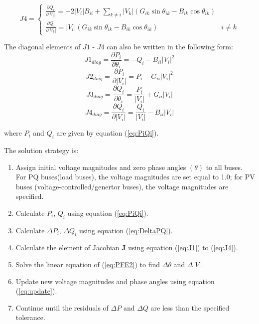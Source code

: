 \documentclass[12pt]{article}
\begin{document}
\begin{equation}\label{eq:J4}
J4 =\left\{\begin{matrix}

\frac{\partial Q_i}{\partial |V_i|} = -2|V_i|B_{ii} + \sum_{k\ne i}{|V_k|  \left (G_{ik}\sin\theta_{ik} - B_{ik}\cos\theta_{ik}\right )} &\\
\frac{\partial Q_i}{\partial |V_k|} = |V_i|\left ( G_{ik}\sin\theta_{ik} -  B_{ik}\cos\theta_{ik}\right )    & i\ne k

\end{matrix}\right .
\end{equation} 

The diagonal elements of $J1$ - $J4$ can also be written in the following form:
\begin{equation}\label{eq:J1D}
J1_{diag} = \frac{\partial P_i}{\partial \theta_i} = -Q_i - B_{ii}|V_i|^2
\end{equation} 
\begin{equation}\label{eq:J2D}
J2_{diag} = \frac{\partial P_i}{\partial |V_i|} = P_i - G_{ii}|V_i|^2
\end{equation} 
\begin{equation}\label{eq:J3D}
J3_{diag} = \frac{\partial Q_i}{\partial \theta_i} = \frac{P_i}{|V_i|} + G_{ii}|V_i|
\end{equation} 
\begin{equation}\label{eq:J4D}
J4_{diag} = \frac{\partial Q_i}{\partial |V_i|} = \frac{Q_i}{|V_i|} - B_{ii}|V_i|
\end{equation} 

where $P_i$ and $Q_i$ are given by equation (\ref{eq:PiQi}).

The solution strategy is:
\begin{enumerate}
\item Assign initial voltage magnitudes and zero phase angles $\left ( \theta \right )$ to all buses. For PQ buses(load buses), the voltage magnitudes are set equal to 1.0; for PV buses (voltage-controlled/genertor buses), the voltage magnitudes are specified.
\item Calculate $P_{i}$, $Q_i$ using equation (\ref{eq:PiQi}).
\item Calculate $\Delta P_{i}$, $\Delta Q_{i}$ using equation (\ref{eq:DeltaPQ}).
\item Calculate the element of Jacobian $\mathbf{J}$ using equation (\ref{eq:J1}) to (\ref{eq:J4}).
\item Solve the linear equation of (\ref{eq:PFE2}) to find $\Delta \theta$ and $\Delta |V|$.
\item Update new voltage magnitudes and phase angles using equation (\ref{eq:update}).
\item Continue until the residuals of $\Delta P$ and $\Delta Q$ are less than the specified tolerance. 
\end{enumerate}
\end{document}
